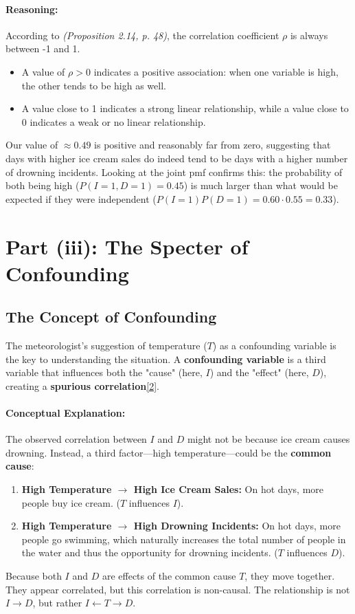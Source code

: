 \documentclass[11pt,a4paper]{article}
\newcommand{\scriptcite}[2]{\textit{(#1, p. #2)}}
\begin{document}
\paragraph{Reasoning:}
According to \scriptcite{Proposition 2.14}{48}, the correlation coefficient $\rho$ is always between -1 and 1.
\begin{itemize}
    \item A value of $\rho > 0$ indicates a positive association: when one variable is high, the other tends to be high as well.
    \item A value close to 1 indicates a strong linear relationship, while a value close to 0 indicates a weak or no linear relationship.
\end{itemize}
Our value of $\approx 0.49$ is positive and reasonably far from zero, suggesting that days with higher ice cream sales do indeed tend to be days with a higher number of drowning incidents. Looking at the joint pmf confirms this: the probability of both being high ($P(I=1, D=1)=0.45$) is much larger than what would be expected if they were independent ($P(I=1)P(D=1) = 0.60 \cdot 0.55 = 0.33$).

\section{Part (iii): The Specter of Confounding}
\subsection{The Concept of Confounding}
The meteorologist's suggestion of temperature ($T$) as a confounding variable is the key to understanding the situation. A \textbf{confounding variable} is a third variable that influences both the "cause" (here, $I$) and the "effect" (here, $D$), creating a \textbf{spurious correlation}\hyperlink{note2}{[2]}.

\paragraph{Conceptual Explanation:}
The observed correlation between $I$ and $D$ might not be because ice cream causes drowning. Instead, a third factor—high temperature—could be the \textbf{common cause}:
\begin{enumerate}
    \item \textbf{High Temperature $\rightarrow$ High Ice Cream Sales:} On hot days, more people buy ice cream. ($T$ influences $I$).
    \item \textbf{High Temperature $\rightarrow$ High Drowning Incidents:} On hot days, more people go swimming, which naturally increases the total number of people in the water and thus the opportunity for drowning incidents. ($T$ influences $D$).
\end{enumerate}
Because both $I$ and $D$ are effects of the common cause $T$, they move together. They appear correlated, but this correlation is non-causal. The relationship is not $I \rightarrow D$, but rather $I \leftarrow T \rightarrow D$.
\end{document}
